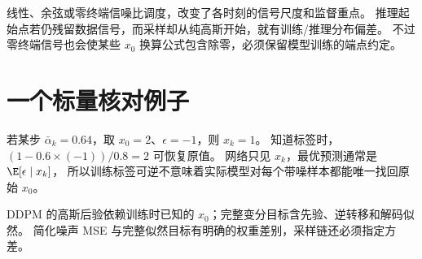 线性、余弦或零终端信噪比调度，改变了各时刻的信号尺度和监督重点。
推理起始点若仍残留数据信号，而采样却从纯高斯开始，就有训练/推理分布偏差。
不过零终端信号也会使某些 $x_0$ 换算公式包含除零，必须保留模型训练的端点约定。

\section{一个标量核对例子}

若某步 $\bar\alpha_k=0.64$，取 $x_0=2$、$\epsilon=-1$，则 $x_k=1$。
知道标签时，$(1-0.6\times(-1))/0.8=2$ 可恢复原值。
网络只见 $x_k$，最优预测通常是 $\E[\epsilon\mid x_k]$，
所以训练标签可逆不意味着实际模型对每个带噪样本都能唯一找回原始 $x_0$。

\begin{theorytakeaway}
DDPM 的高斯后验依赖训练时已知的 $x_0$；完整变分目标含先验、逆转移和解码似然。
简化噪声 MSE 与完整似然目标有明确的权重差别，采样链还必须指定方差。
\end{theorytakeaway}
